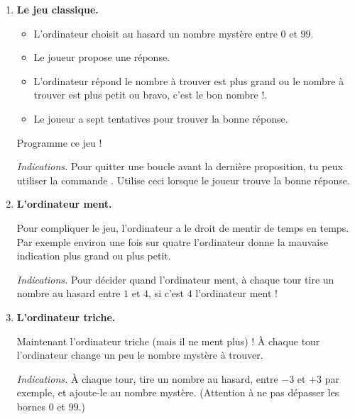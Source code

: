 \documentclass[11pt,class=report,crop=false]{standalone}
\begin{document}
\bigskip
\bigskip


\begin{activite}



\begin{enumerate}
  \item \textbf{Le jeu classique.}
  \begin{itemize}
    \item L'ordinateur choisit au hasard un nombre mystère entre $0$ et $99$.
    \item Le joueur propose une réponse.
    \item L'ordinateur répond 
    \og{}le nombre à trouver est plus grand\fg{} ou
     \og{}le nombre à trouver est plus petit\fg{} ou
      \og{}bravo, c'est le bon nombre !\fg{}. 
     \item Le joueur a sept tentatives pour trouver la bonne réponse.
  \end{itemize}
  
  Programme ce jeu !
  
  \emph{Indications.} Pour quitter une boucle  avant la dernière proposition, tu peux utiliser la commande . Utilise ceci lorsque le joueur trouve la bonne réponse.

  
  \item \textbf{L'ordinateur ment.}
  
  Pour compliquer le jeu, l'ordinateur a le droit de mentir de temps en temps.
  Par exemple environ une fois sur quatre l'ordinateur donne la mauvaise indication \og{}plus grand\fg{}
  ou \og{}plus petit\fg{}.
  
  \emph{Indications.} Pour décider quand l'ordinateur ment, à chaque tour tire un nombre au hasard entre $1$ et $4$, si c'est $4$ l'ordinateur ment !
  
  
  
  
  \item \textbf{L'ordinateur triche.}
  
  Maintenant l'ordinateur triche (mais il ne ment plus) ! À chaque tour l'ordinateur change un peu le nombre mystère à trouver.
  
    \emph{Indications.} À chaque tour, tire un nombre au hasard, entre $-3$ et $+3$ par exemple, et ajoute-le au nombre mystère. (Attention à ne pas dépasser les bornes $0$ et $99$.)
  
\end{enumerate}   
     
\end{activite}
\end{document}
